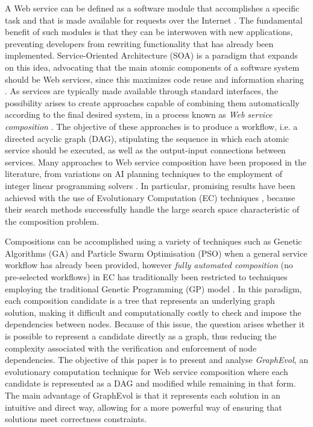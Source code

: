 \documentclass{article}
\begin{document}
A Web service can be defined as a software module that accomplishes a specific task and that is made available for requests over
the Internet \cite{gottschalk2002introduction}. The fundamental benefit of such modules is that they can be interwoven with new applications, preventing developers from rewriting
functionality that has already been implemented. Service-Oriented Architecture (SOA) is a paradigm that expands on this idea, advocating
that the main atomic components of a software system should be Web services, since this maximizes code reuse and information sharing \cite{perrey2003service,channabasavaiah2003migrating}.
As services are typically made available through standard interfaces, the possibility arises to create approaches capable of combining them
automatically according to the final desired system, in a process known as \textit{Web service composition} \cite{milanovic2004current}. The objective of these approaches
is to produce a workflow, i.e. a directed acyclic graph (DAG), stipulating the sequence in which each atomic service should be executed, as well as
the output-input connections between services.
Many approaches to Web service composition have been proposed in the literature, from variations on AI planning techniques \cite{deng2013efficient,bucchiarone2014domain} to the employment
of integer linear programming solvers \cite{ardagna2007adaptive,yoo2008web}. In particular, promising results have been achieved with the use of Evolutionary Computation (EC) techniques \cite{wang2012survey,su2014efficient},
because their search methods successfully handle the large search space characteristic of the composition problem. 

Compositions can be accomplished using a variety of techniques such as Genetic Algorithms (GA) and Particle Swarm Optimisation
(PSO) \cite{liu2007dynamic,wang2012survey,yin2014hybrid} when a general service workflow has already been provided, however \textit{fully automated composition} (no pre-selected workflows) in EC has traditionally been restricted to techniques employing the traditional Genetic Programming (GP) model \cite{rodriguez2010composition}.
In this paradigm, each composition candidate is a tree that represents an underlying graph solution, making it difficult and computationally costly to check and impose the dependencies between nodes. Because of this issue, the question arises whether it is possible to represent a candidate directly as a graph, thus reducing the complexity associated with the verification and enforcement of node dependencies. The objective of this paper is to present and analyse \textit{GraphEvol}, an evolutionary computation technique for Web service
composition where each candidate is represented as a DAG and modified while remaining in that form. The main
advantage of GraphEvol is that it represents each solution in an intuitive and direct way, allowing for a more powerful way of ensuring that solutions
meet correctness constraints. 
\end{document}
